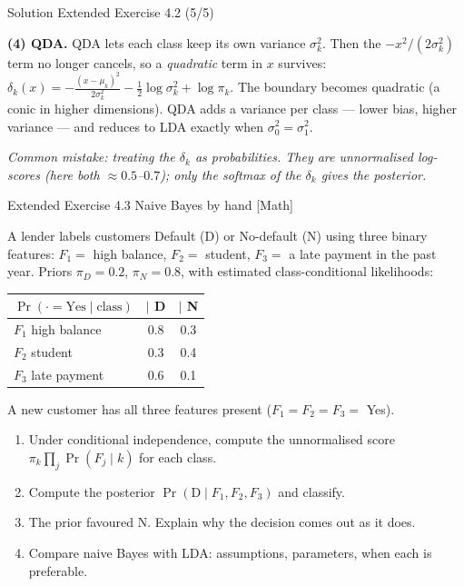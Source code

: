 \documentclass[aspectratio=169,11pt]{beamer}
\begin{document}
\begin{frame}{Solution \textemdash{} Extended Exercise 4.2 (5/5)}
\begin{solutionbox}
\textbf{(4) QDA.} QDA lets each class keep its own variance
$\sigma_k^2$. Then the $-x^2/(2\sigma_k^2)$ term no longer cancels, so a
\emph{quadratic} term in $x$ survives:
$\delta_k(x)=-\tfrac{(x-\mu_k)^2}{2\sigma_k^2}-\tfrac12\log\sigma_k^2+\log\pi_k$.
The boundary becomes quadratic (a conic in higher dimensions). QDA adds a
variance per class --- lower bias, higher variance --- and reduces to LDA
exactly when $\sigma_0^2=\sigma_1^2$.

\vspace{1mm}
\emph{Common mistake: treating the $\delta_k$ as probabilities. They
are unnormalised log-scores (here both $\approx 0.5$--$0.7$); only the
softmax of the $\delta_k$ gives the posterior.}
\end{solutionbox}
\end{frame}

\begin{frame}{Extended Exercise 4.3 \textemdash{} Naive Bayes by hand [Math]}
\begin{longexercise}
\scriptsize
A lender labels customers Default (D) or No-default (N) using three binary
features: $F_1=$ high balance, $F_2=$ student, $F_3=$ a late payment in
the past year. Priors $\pi_D=0.2$, $\pi_N=0.8$, with estimated
class-conditional likelihoods:
\begin{center}\small
\begin{tabular}{lcc}
\toprule
$\Pr(\cdot=\text{Yes}\mid\text{class})$ & $\mid$ D & $\mid$ N \\
\midrule
$F_1$ high balance  & 0.8 & 0.3 \\
$F_2$ student       & 0.3 & 0.4 \\
$F_3$ late payment  & 0.6 & 0.1 \\
\bottomrule
\end{tabular}
\end{center}
A new customer has all three features present ($F_1=F_2=F_3=$ Yes).
\begin{enumerate}
  \item Under conditional independence, compute the unnormalised score
        $\pi_k\prod_j\Pr(F_j\mid k)$ for each class.
  \item Compute the posterior $\Pr(\text{D}\mid F_1,F_2,F_3)$ and classify.
  \item The prior favoured N. Explain why the decision comes out as it
        does.
  \item Compare naive Bayes with LDA: assumptions, parameters, when each
        is preferable.
\end{enumerate}
\end{longexercise}
\end{frame}
\end{document}
